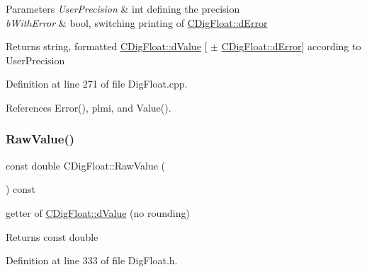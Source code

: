 \begin{DoxyParams}{Parameters}
{\em User\+Precision} & int defining the precision \\
\hline
{\em b\+With\+Error} & bool, switching printing of \hyperlink{classCDigFloat_a25eb3782d1e727ff007a48f8308e3d4d}{C\+Dig\+Float\+::d\+Error} \\
\hline
\end{DoxyParams}
\begin{DoxyReturn}{Returns}
string, formatted \hyperlink{classCDigFloat_a4bbe69e30dd4e20527362493aa9aaf96}{C\+Dig\+Float\+::d\+Value} \mbox{[} $\pm$ \hyperlink{classCDigFloat_a25eb3782d1e727ff007a48f8308e3d4d}{C\+Dig\+Float\+::d\+Error}\mbox{]} according to User\+Precision 
\end{DoxyReturn}


Definition at line 271 of file Dig\+Float.\+cpp.



References Error(), plmi, and Value().

\mbox{\label{classCDigFloat_ab6d3001a549d7496156321cbb26dde51}} 
\subsubsection{\texorpdfstring{Raw\+Value()}{RawValue()}\hspace{0.1cm}{\footnotesize\ttfamily [1/2]}}
{\footnotesize\ttfamily const double C\+Dig\+Float\+::\+Raw\+Value (\begin{DoxyParamCaption}{ }\end{DoxyParamCaption}) const\hspace{0.3cm}{\ttfamily [inline]}}



getter of \hyperlink{classCDigFloat_a4bbe69e30dd4e20527362493aa9aaf96}{C\+Dig\+Float\+::d\+Value} (no rounding) 

\begin{DoxyReturn}{Returns}
const double 
\end{DoxyReturn}


Definition at line 333 of file Dig\+Float.\+h.

\mbox{\label{classCDigFloat_a10dd39f19bfc21ae1d545d9203ef3e95}} 
